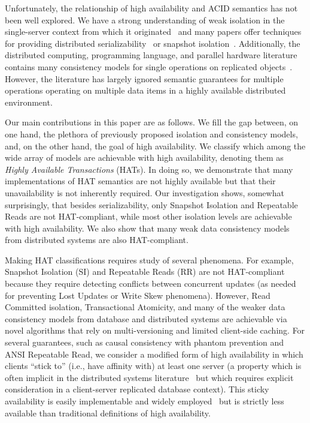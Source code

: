 Unfortunately, the relationship of high availability and ACID
semantics has not been well explored. We have a strong understanding
of weak isolation in the single-server context from which it
originated~\cite{adya, ansicritique, gray-isolation} and many papers
offer techniques for providing distributed
serializability~\cite{bernstein-book, spanner, daudjee-session,
  hstore, krikellas-bargain, calvin, kemme-classification} or snapshot
isolation~\cite{daudjee-snapshot,generalizedsnapshot, kemme-snapshot,
  walter}. Additionally, the distributed computing, programming
language, and parallel hardware literature contains many
consistency models for single operations on replicated objects~\cite{
  ceri-mechanism, chen-mechanism, pnuts, herlihy-art, eiger, cac,
  sessionguarantees}. However, the literature has largely ignored
semantic guarantees for multiple operations operating on multiple data
items in a highly available distributed environment.

Our main contributions in this paper are as follows. We fill the gap
between, on one hand, the plethora of previously proposed isolation
and consistency models, and, on the other hand, the goal of high
availability.  We classify which among the wide array of models are
achievable with high availability, denoting them as {\em Highly
  Available Transactions} (HATs). In doing so, we demonstrate that many
implementations of HAT semantics are not highly available but
that their unavailability is not inherently required. Our
investigation shows, somewhat surprisingly, that besides
serializability, only Snapshot Isolation and Repeatable Reads are not
HAT-compliant, while most other isolation levels are achievable with
high availability. We also show that many weak data consistency models
from distributed systems are also HAT-compliant.

Making HAT classifications requires study of several phenomena. For
example, Snapshot Isolation (SI) and Repeatable Reads (RR) are not
HAT-compliant because they require detecting conflicts between
concurrent updates (as needed for preventing Lost Updates or Write
Skew phenomena). However, Read Committed isolation, Transactional
Atomicity, and many of the weaker data consistency models from
database and distributed systems are achievable via novel algorithms
that rely on multi-versioning and limited client-side caching. For
several guarantees, such as causal consistency with phantom prevention
and ANSI Repeatable Read, we consider a modified form of high
availability in which clients ``stick to'' (i.e., have affinity with)
at least one server (a property which is often implicit in the
distributed systems literature~\cite{herlihy-art, eiger, cac} but
which requires explicit consideration in a client-server replicated
database context). This sticky availability is easily implementable
and widely employed~\cite{eiger, vogels-defs} but is strictly less
available than traditional definitions of high availability.

